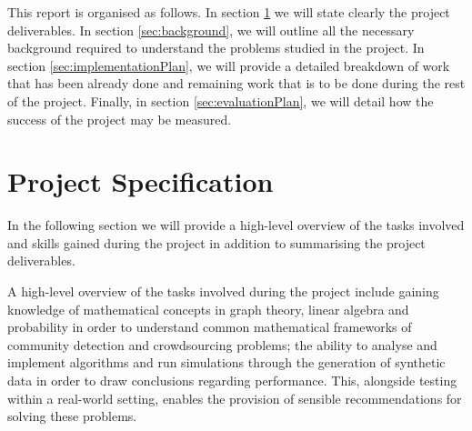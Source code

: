 \documentclass[12pt]{article}
\numberwithin{equation}{section}
\begin{document}
This report is organised as follows. In section \ref{sec:projectSpecification} we will state clearly the project deliverables. In section \ref{sec:background}, we will outline all the necessary background required to understand the problems studied in the project. In section \ref{sec:implementationPlan}, we will provide a detailed breakdown of work that has been already done and remaining work that is to be done during the rest of the project. Finally, in section \ref{sec:evaluationPlan}, we will detail how the success of the project may be measured.


\newpage
\thispagestyle{plain}
\mbox{}
\section {Project Specification}
\label{sec:projectSpecification}

In the following section we will provide a high-level overview of the tasks involved and skills gained during the project in addition to summarising the project deliverables.

A high-level overview of the tasks involved during the project include gaining knowledge of mathematical concepts in graph theory, linear algebra and probability in order to understand common mathematical frameworks of community detection and crowdsourcing problems; the ability to analyse and implement algorithms and run simulations through the generation of synthetic data in order to draw conclusions regarding performance. This, alongside testing within a real-world setting, enables the provision of sensible recommendations for solving these problems.
\end{document}
